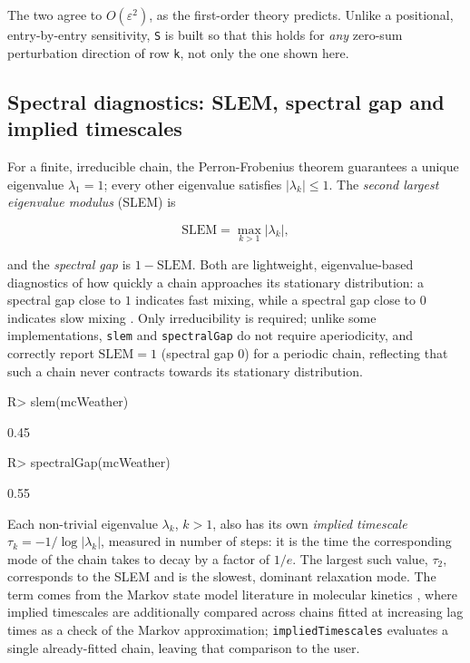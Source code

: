 \documentclass[
  nojss]{jss}
\begin{document}
The two agree to \(O(\varepsilon^2)\), as the first-order theory predicts.
Unlike a positional, entry-by-entry sensitivity, \texttt{S} is built so that this
holds for \emph{any} zero-sum perturbation direction of row \texttt{k}, not only the
one shown here.

\subsection{Spectral diagnostics: SLEM, spectral gap and implied timescales}\label{spectral-diagnostics-slem-spectral-gap-and-implied-timescales}

For a finite, irreducible chain, the Perron-Frobenius theorem guarantees a
unique eigenvalue \(\lambda_1=1\); every other eigenvalue satisfies
\(|\lambda_k|\le 1\). The \emph{second largest eigenvalue modulus} (SLEM) is

\[
\mathrm{SLEM} = \max_{k>1} |\lambda_k|,
\]

and the \emph{spectral gap} is \(1-\mathrm{SLEM}\). Both are lightweight,
eigenvalue-based diagnostics of how quickly a chain approaches its
stationary distribution: a spectral gap close to \(1\) indicates fast mixing,
while a spectral gap close to \(0\) indicates slow mixing \citep{levinPeres2017}.
Only irreducibility is required; unlike some implementations, \texttt{slem} and
\texttt{spectralGap} do not require aperiodicity, and correctly report
\(\mathrm{SLEM}=1\) (spectral gap \(0\)) for a periodic chain, reflecting that
such a chain never contracts towards its stationary distribution.

\begin{CodeChunk}
\begin{CodeInput}
R> slem(mcWeather)
\end{CodeInput}
\begin{CodeOutput}
[1] 0.45
\end{CodeOutput}
\begin{CodeInput}
R> spectralGap(mcWeather)
\end{CodeInput}
\begin{CodeOutput}
[1] 0.55
\end{CodeOutput}
\end{CodeChunk}

Each non-trivial eigenvalue \(\lambda_k\), \(k>1\), also has its own \emph{implied
timescale} \(\tau_k=-1/\log|\lambda_k|\), measured in number of steps: it is
the time the corresponding mode of the chain takes to decay by a factor of
\(1/e\). The largest such value, \(\tau_2\), corresponds to the SLEM and is the
slowest, dominant relaxation mode. The term comes from the Markov state
model literature in molecular kinetics \citep{swope2004describing,
prinz2011markov}, where implied timescales are additionally compared across
chains fitted at increasing lag times as a check of the Markov
approximation; \texttt{impliedTimescales} evaluates a single already-fitted chain,
leaving that comparison to the user.
\end{document}
